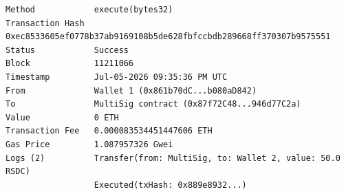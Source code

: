 \begin{lstlisting}[caption={Transakcija 5: izvr\v senje (\texttt{execute})}, label={lst:onchain-tx5}]
Method            execute(bytes32)
Transaction Hash  0xec8533605ef0778b37ab9169108b5de628fbfccbdb289668ff370307b9575551
Status            Success
Block             11211066
Timestamp         Jul-05-2026 09:35:36 PM UTC
From              Wallet 1 (0x861b70dC...b080aD842)
To                MultiSig contract (0x87f72C48...946d77C2a)
Value             0 ETH
Transaction Fee   0.000083534451447606 ETH
Gas Price         1.087957326 Gwei
Logs (2)          Transfer(from: MultiSig, to: Wallet 2, value: 50.0 RSDC)
                  Executed(txHash: 0x889e8932...)
\end{lstlisting}
